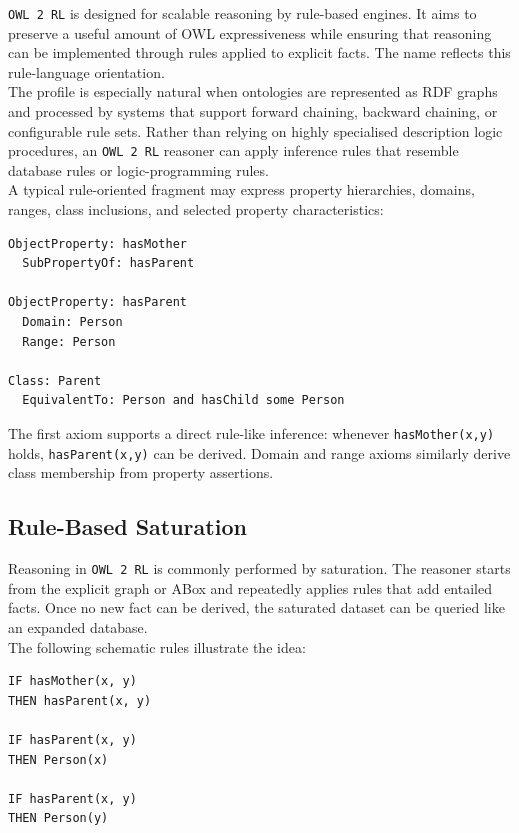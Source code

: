 \documentclass{scrbook}
\begin{document}
	\texttt{OWL 2 RL} is designed for scalable reasoning by rule-based engines. It aims to preserve a useful amount of OWL expressiveness while ensuring that reasoning can be implemented through rules applied to explicit facts. The name reflects this rule-language orientation.\\
	
	The profile is especially natural when ontologies are represented as RDF graphs and processed by systems that support forward chaining, backward chaining, or configurable rule sets. Rather than relying on highly specialised description logic procedures, an \texttt{OWL 2 RL} reasoner can apply inference rules that resemble database rules or logic-programming rules.\\
	
	A typical rule-oriented fragment may express property hierarchies, domains, ranges, class inclusions, and selected property characteristics:
	
	\begin{lstlisting}
ObjectProperty: hasMother
  SubPropertyOf: hasParent

ObjectProperty: hasParent
  Domain: Person
  Range: Person

Class: Parent
  EquivalentTo: Person and hasChild some Person
	\end{lstlisting}
	
	The first axiom supports a direct rule-like inference: whenever \texttt{hasMother(x,y)} holds, \texttt{hasParent(x,y)} can be derived. Domain and range axioms similarly derive class membership from property assertions.
	
	\subsection{Rule-Based Saturation}
	
	Reasoning in \texttt{OWL 2 RL} is commonly performed by saturation. The reasoner starts from the explicit graph or ABox and repeatedly applies rules that add entailed facts. Once no new fact can be derived, the saturated dataset can be queried like an expanded database.\\
	
	The following schematic rules illustrate the idea:
	\begin{lstlisting}
IF hasMother(x, y)
THEN hasParent(x, y)

IF hasParent(x, y)
THEN Person(x)

IF hasParent(x, y)
THEN Person(y)
	\end{lstlisting}
	
\end{document}
